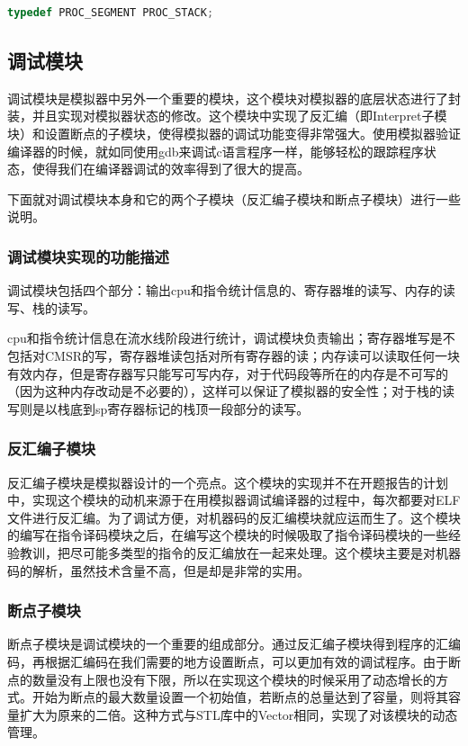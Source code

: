 \documentclass[12pt,a4paper]{article}
\begin{document}
\begin{lstlisting}[language={C}]
typedef PROC_SEGMENT PROC_STACK;
\end{lstlisting}


\subsection{调试模块}

调试模块是模拟器中另外一个重要的模块，这个模块对模拟器的底层状态进行了封装，并且实现对模拟器状态的修改。这个模块中实现了反汇编（即Interpret子模块）和设置断点的子模块，使得模拟器的调试功能变得非常强大。使用模拟器验证编译器的时候，就如同使用gdb来调试c语言程序一样，能够轻松的跟踪程序状态，使得我们在编译器调试的效率得到了很大的提高。

下面就对调试模块本身和它的两个子模块（反汇编子模块和断点子模块）进行一些说明。

\subsubsection{调试模块实现的功能描述}

调试模块包括四个部分：输出cpu和指令统计信息的、寄存器堆的读写、内存的读写、栈的读写。

cpu和指令统计信息在流水线阶段进行统计，调试模块负责输出；寄存器堆写是不包括对CMSR的写，寄存器堆读包括对所有寄存器的读；内存读可以读取任何一块有效内存，但是寄存器写只能写可写内存，对于代码段等所在的内存是不可写的（因为这种内存改动是不必要的），这样可以保证了模拟器的安全性；对于栈的读写则是以栈底到sp寄存器标记的栈顶一段部分的读写。

\subsubsection{反汇编子模块}

反汇编子模块是模拟器设计的一个亮点。这个模块的实现并不在开题报告的计划中，实现这个模块的动机来源于在用模拟器调试编译器的过程中，每次都要对ELF文件进行反汇编。为了调试方便，对机器码的反汇编模块就应运而生了。这个模块的编写在指令译码模块之后，在编写这个模块的时候吸取了指令译码模块的一些经验教训，把尽可能多类型的指令的反汇编放在一起来处理。这个模块主要是对机器码的解析，虽然技术含量不高，但是却是非常的实用。

\subsubsection{断点子模块}

断点子模块是调试模块的一个重要的组成部分。通过反汇编子模块得到程序的汇编码，再根据汇编码在我们需要的地方设置断点，可以更加有效的调试程序。由于断点的数量没有上限也没有下限，所以在实现这个模块的时候采用了动态增长的方式。开始为断点的最大数量设置一个初始值，若断点的总量达到了容量，则将其容量扩大为原来的二倍。这种方式与STL库中的Vector相同，实现了对该模块的动态管理。
\end{document}
